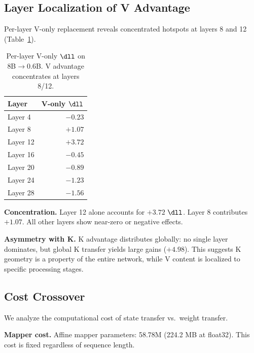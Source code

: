\subsection{Layer Localization of V Advantage}

Per-layer V-only replacement reveals concentrated hotspots
at layers 8 and 12 (Table~\ref{tab:layers}).

\begin{table}[t]
\centering
\caption{Per-layer V-only $\dll$ on 8B$\to$0.6B.
V advantage concentrates at layers 8/12.}
\label{tab:layers}
\begin{tabular}{lr}
\toprule
Layer & V-only $\dll$ \\
\midrule
Layer 4 & $-0.23$ \\
Layer 8 & $+1.07$ \\
Layer 12 & $+3.72$ \\
Layer 16 & $-0.45$ \\
Layer 20 & $-0.89$ \\
Layer 24 & $-1.23$ \\
Layer 28 & $-1.56$ \\
\bottomrule
\end{tabular}
\end{table}

\textbf{Concentration.}
Layer 12 alone accounts for $+3.72$ $\dll$.
Layer 8 contributes $+1.07$.
All other layers show near-zero or negative effects.

\textbf{Asymmetry with K.}
K advantage distributes globally:
no single layer dominates, but global K transfer yields large gains ($+4.98$).
This suggests K geometry is a property of the entire network,
while V content is localized to specific processing stages.

\subsection{Cost Crossover}

We analyze the computational cost of state transfer vs.\ weight transfer.

\textbf{Mapper cost.}
Affine mapper parameters: 58.78M (224.2 MB at float32).
This cost is fixed regardless of sequence length.

